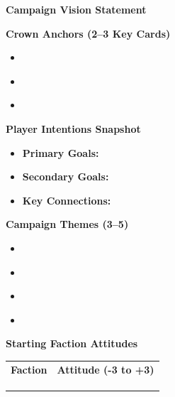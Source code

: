 \documentclass[11pt]{article}
\begin{document}
\begin{tcolorbox}[
  title=\textbf{Session Zero: Campaign Summary (Quick Reference)},
  colback=gray!10,
  colframe=black,
  fonttitle=\bfseries,
  left=6pt,
  right=6pt,
  top=6pt,
  bottom=6pt,
  enhanced,
  sharp corners
,breakable]

\textbf{Campaign Vision Statement} \\
\underline{\phantom{XXXXXXXXXXXXXXXXXXXXXXXXXXXXXXXXXXXXXXXXXXXX}}

\medskip

\textbf{Crown Anchors (2--3 Key Cards)}
\begin{itemize}[leftmargin=1.2em]
  \item \underline{\phantom{Anchor 1 Here}}
  \item \underline{\phantom{Anchor 2 Here}}
  \item \underline{\phantom{Anchor 3 Here}}
\end{itemize}

\medskip

\textbf{Player Intentions Snapshot}
\begin{itemize}[leftmargin=1.2em]
  \item \textbf{Primary Goals:} \underline{\phantom{XXXXXXXXXXXXXXXXXXX}}
  \item \textbf{Secondary Goals:} \underline{\phantom{XXXXXXXXXXXXXXXXX}}
  \item \textbf{Key Connections:} \underline{\phantom{XXXXXXXXXXXXXXX}}
\end{itemize}

\medskip

\textbf{Campaign Themes (3--5)}
\begin{itemize}[leftmargin=1.2em]
  \item \underline{\phantom{Theme}}
  \item \underline{\phantom{Theme}}
  \item \underline{\phantom{Theme}}
  \item \underline{\phantom{Theme}}
\end{itemize}

\medskip

\textbf{Starting Faction Attitudes}
\begin{longtable}{p{3.5cm}p{4cm}}
\textbf{Faction} & \textbf{Attitude (-3 to +3)} \\
\underline{\phantom{Faction}} & \underline{\phantom{X}} \\
\underline{\phantom{Faction}} & \underline{\phantom{X}} \\
\underline{\phantom{Faction}} & \underline{\phantom{X}} \\
\end{longtable}


\end{tcolorbox}
\end{document}
